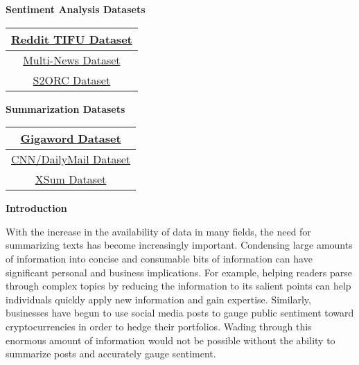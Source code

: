 \begin{multicols}{2}
    \begin{center}
        \begin{large}
            \noindent\textbf{Sentiment Analysis Datasets}
        \end{large}
    \end{center}

    \begin{center}
        \begin{tabular}{|c|}
            \hline
            \href{https://paperswithcode.com/dataset/reddit-tifu}{Reddit TIFU Dataset\cite{RedditTIFU}} \\ \hline
            \href{https://paperswithcode.com/dataset/multi-news}{Multi-News Dataset\cite{Multinews}} \\ \hline
            \href{https://paperswithcode.com/dataset/s2orc}{S2ORC Dataset\cite{S2ORC}} \\ \hline
        \end{tabular}
    \end{center}

    \begin{center}
        \begin{large}
            \noindent\textbf{Summarization Datasets}
        \end{large}
    \end{center}

    \begin{center}
        \begin{tabular}{|c|}
            \hline
            \href{https://huggingface.co/datasets/gigaword}{Gigaword Dataset\cite{Gigaword1,Gigaword2}} \\ \hline
            \href{https://huggingface.co/datasets/cnn_dailymail}{CNN/DailyMail Dataset\cite{CNNDM}} \\ \hline
            \href{https://huggingface.co/datasets/xsum}{XSum Dataset\cite{XSumDataset}} \\ \hline
        \end{tabular}
    \end{center}

\end{multicols}

\begin{large}
    \noindent\textbf{Introduction}
\end{large}

\vspace{5pt}

With the increase in the availability of data in many fields, the need for summarizing texts has become increasingly important.
Condensing large amounts of information into concise and consumable bits of information can have significant personal and business implications.
For example, helping readers parse through complex topics by reducing the information to its salient points can help individuals quickly apply new information and gain expertise.
Similarly, businesses have begun to use social media posts to gauge public sentiment toward cryptocurrencies in order to hedge their portfolios\cite{Crypto1, Crypto2}.
Wading through this enormous amount of information would not be possible without the ability to summarize posts and accurately gauge sentiment.

